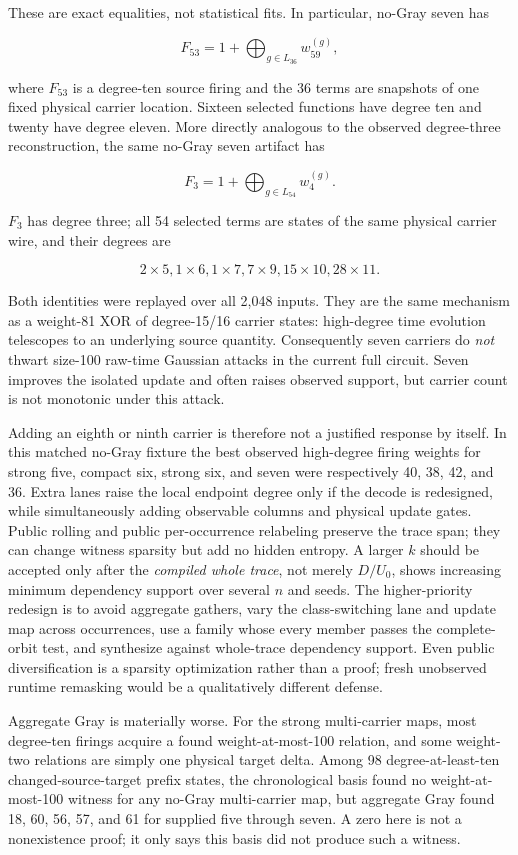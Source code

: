 \documentclass[11pt]{article}
\begin{document}
These are exact equalities, not statistical fits.  In particular, no-Gray
seven has

\[
  F_{53}=1+\bigoplus_{g\in L_{36}}w_{59}^{(g)},
\]

where $F_{53}$ is a degree-ten source firing and the 36 terms are snapshots of
one fixed physical carrier location.  Sixteen selected functions have degree
ten and twenty have degree eleven.  More directly analogous to the observed
degree-three reconstruction, the same no-Gray seven artifact has

\[
  F_{3}=1+\bigoplus_{g\in L_{54}}w_{4}^{(g)} .
\]

$F_3$ has degree three; all 54 selected terms are states of the same physical
carrier wire, and their degrees are

\[
  2\times5, 1\times6, 1\times7, 7\times9,
  15\times10, 28\times11.
\]

Both identities were replayed over all 2,048 inputs.  They are the same
mechanism as a weight-81 XOR of degree-15/16 carrier states: high-degree time
evolution telescopes to an underlying source quantity.  Consequently seven
carriers do \emph{not} thwart size-100 raw-time Gaussian attacks in the current
full circuit.  Seven improves the isolated update and often raises observed
support, but carrier count is not monotonic under this attack.

Adding an eighth or ninth carrier is therefore not a justified response by
itself.  In this matched no-Gray fixture the best observed high-degree firing
weights for strong five, compact six, strong six, and seven were respectively
40, 38, 42, and 36.  Extra lanes raise the local endpoint degree only if the
decode is redesigned, while simultaneously adding observable columns and
physical update gates.  Public rolling and public per-occurrence relabeling
preserve the trace span; they can change witness sparsity but add no hidden
entropy.  A larger $k$ should be accepted only after the \emph{compiled whole
trace}, not merely $D/U_0$, shows increasing minimum dependency support over
several $n$ and seeds.  The higher-priority redesign is to avoid aggregate
gathers, vary the class-switching lane and update map across occurrences, use
a family whose every member passes the complete-orbit test, and synthesize
against whole-trace dependency support.  Even public diversification is a
sparsity optimization rather than a proof; fresh unobserved runtime remasking
would be a qualitatively different defense.

Aggregate Gray is materially worse.  For the strong multi-carrier maps, most
degree-ten firings acquire a found weight-at-most-100 relation, and some
weight-two relations are simply one physical target delta.  Among 98
degree-at-least-ten changed-source-target prefix states, the chronological
basis found no weight-at-most-100 witness for any no-Gray multi-carrier map,
but aggregate Gray found 18, 60, 56, 57, and 61 for supplied five through
seven.  A zero here is not a nonexistence proof; it only says this basis did not
produce such a witness.
\end{document}
